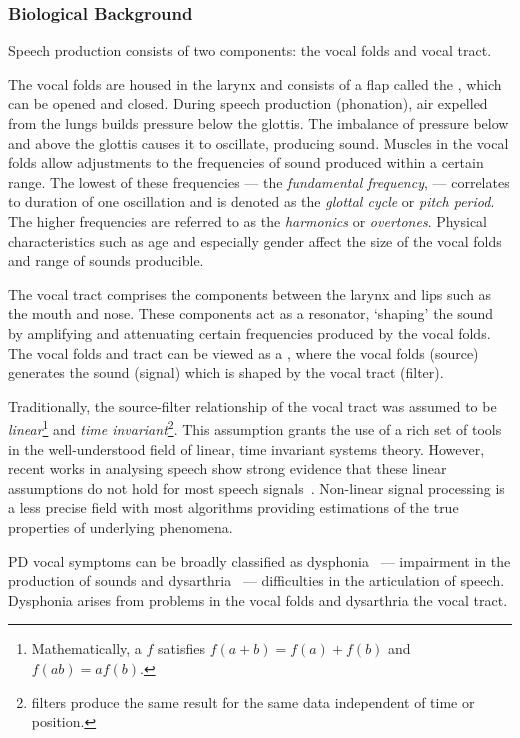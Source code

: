 \documentclass[12pt, twoside]{book}
\renewcommand\emph[1]{\textit{\color{USred}{#1}}}
\begin{document}
\subsubsection{Biological Background}
\label{speechbio}
Speech production consists of two components: the vocal folds and vocal tract. 

The vocal folds are housed in the larynx and consists of a flap called the \emph{glottis}, which can be opened and closed. During speech production (phonation), air expelled from the lungs builds pressure below the glottis. The imbalance of pressure below and above the glottis causes it to oscillate, producing sound. Muscles in the vocal folds allow adjustments to the frequencies of sound produced within a certain range. The lowest of these frequencies --- the \textit{fundamental frequency}, \emph{$f_0$} --- correlates to duration of one oscillation and is denoted as the \textit{glottal cycle} or \textit{pitch period}. The higher frequencies are referred to as the \textit{harmonics} or \textit{overtones}. Physical characteristics such as age and especially gender affect the size of the vocal folds and range of sounds producible. 

The vocal tract comprises the components between the larynx and lips such as the mouth and nose. These components act as a resonator, `shaping' the sound by amplifying and attenuating certain frequencies produced by the vocal folds. The vocal folds and tract can be viewed as a \emph{source-filter model}, where the vocal folds (source) generates the sound (signal) which is shaped by the vocal tract (filter). 


Traditionally, the source-filter relationship of the vocal tract was assumed to be \textit{linear}\footnote{Mathematically, a \emph{linear function} $f$ satisfies $f(a+b) = f(a) + f(b)$ and $f(ab) = af(b)$.} and \textit{time invariant}\footnote{\emph{Time invariant} filters produce the same result for the same data independent of time or position.}. This assumption grants the use of a rich set of tools in the well-understood field of linear, time invariant systems theory. However, recent works in analysing speech show strong evidence that these linear assumptions do not hold for most speech signals~\cite{nonlineardisorder, little2007biomechanically,titze2008nonlinear}. Non-linear signal processing is a less precise field with most algorithms providing estimations of the true properties of underlying phenomena. 


PD vocal symptoms can be broadly classified as dysphonia~\cite{spworkshoptitze} --- impairment in the production of sounds and dysarthria~\cite{rosen2006parametric} --- difficulties in the articulation of speech. Dysphonia arises from problems in the vocal folds and dysarthria the vocal tract. 
\end{document}
